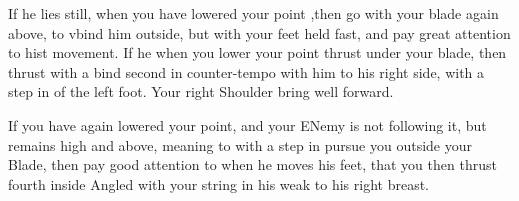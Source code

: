 If he lies still, when you have lowered your point ,then go with your
blade again above, to vbind him outside, but with your feet held fast,
and pay great attention to hist movement. If he when you lower your
point thrust under your blade, then thrust with a bind second in
counter-tempo with him to his right side, with a step in of the left
foot. Your right Shoulder bring well forward.

\exercise{}

If you have again lowered your point, and your ENemy is not following
it, but remains high and above, meaning to with a step in pursue you
outside your Blade, then pay good attention to when he moves his feet,
that you then thrust fourth inside Angled with your string in his weak
to his right breast.
